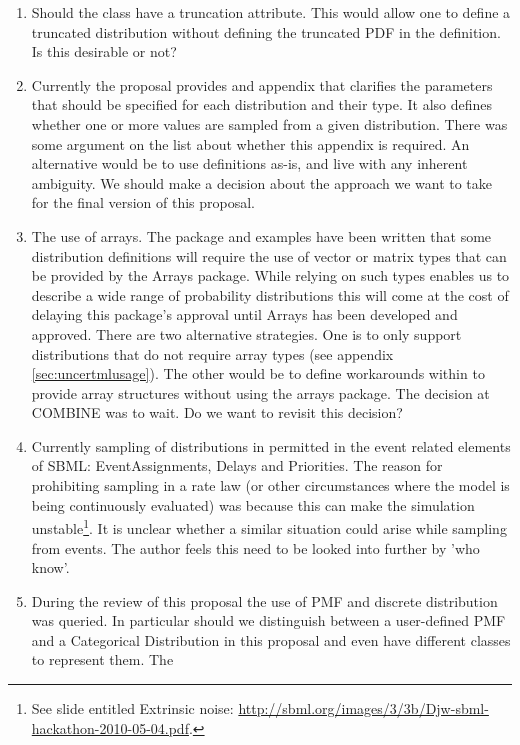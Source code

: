 \documentclass[draftspec]{sbmlpkgspec}
\begin{document}
\begin{enumerate}
\item Should the  class have a truncation
  attribute. This would allow one to define a truncated distribution
  without defining the truncated PDF in the \mathml definition. Is
  this desirable or not?
\item Currently the proposal provides and appendix that clarifies the
  parameters that should be specified for each \uncertml distribution and their
  type. It also defines whether one or more values are sampled from a
  given distribution. There was some argument on the list about
  whether this appendix is required. An alternative would be to use
  \uncertml definitions as-is, and live with any inherent
  ambiguity. We should make a decision about the approach we want to
  take for the final version of this proposal.
\item The use of arrays. The package and examples have been written
  that some distribution definitions will require the use of vector or
  matrix types that can be provided by the Arrays package. While
  relying on such types enables us to describe a wide range of
  probability distributions this will come at the cost of delaying
  this package's approval until Arrays has been developed and
  approved. There are two alternative strategies. One is to only
  support distributions that do not require array types (see appendix
  \ref{sec:uncertmlusage}). The other would be to define workarounds
  within \distribshort to provide array structures without using the
  arrays package. The decision at COMBINE was to wait. Do we want to
  revisit this decision?
\item Currently sampling of distributions in permitted in the event
  related elements of SBML: EventAssignments, Delays and
Priorities. The reason for prohibiting sampling in a rate law (or other
circumstances where the model is being continuously evaluated) was
because this can make the simulation unstable\footnote{See slide entitled Extrinsic
  noise:
  \url{http://sbml.org/images/3/3b/Djw-sbml-hackathon-2010-05-04.pdf}.}. It
is unclear whether a similar situation could arise while sampling from
events. The author feels this need to be looked into further by 'who know'.
\item During the review of this proposal the use of PMF and discrete
  distribution was queried. In particular should we distinguish
  between a user-defined PMF and a Categorical Distribution in this
  proposal and even have different classes to represent them. The

\end{enumerate}
\end{document}
